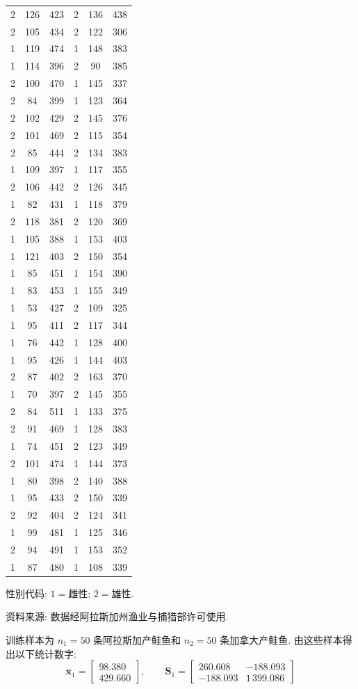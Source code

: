 \begin{mvtable}
\begin{longtable}{cccccc}
2 & 126 & 423 & 2 & 136 & 438\\
2 & 105 & 434 & 2 & 122 & 306\\
1 & 119 & 474 & 1 & 148 & 383\\
1 & 114 & 396 & 2 & 90 & 385\\
2 & 100 & 470 & 1 & 145 & 337\\
2 & 84 & 399 & 1 & 123 & 364\\
2 & 102 & 429 & 2 & 145 & 376\\
2 & 101 & 469 & 2 & 115 & 354\\
2 & 85 & 444 & 2 & 134 & 383\\
1 & 109 & 397 & 1 & 117 & 355\\
2 & 106 & 442 & 2 & 126 & 345\\
1 & 82 & 431 & 1 & 118 & 379\\
2 & 118 & 381 & 2 & 120 & 369\\
1 & 105 & 388 & 1 & 153 & 403\\
1 & 121 & 403 & 2 & 150 & 354\\
1 & 85 & 451 & 1 & 154 & 390\\
1 & 83 & 453 & 1 & 155 & 349\\
1 & 53 & 427 & 2 & 109 & 325\\
1 & 95 & 411 & 2 & 117 & 344\\
1 & 76 & 442 & 1 & 128 & 400\\
1 & 95 & 426 & 1 & 144 & 403\\
2 & 87 & 402 & 2 & 163 & 370\\
1 & 70 & 397 & 2 & 145 & 355\\
2 & 84 & 511 & 1 & 133 & 375\\
2 & 91 & 469 & 1 & 128 & 383\\
1 & 74 & 451 & 2 & 123 & 349\\
2 & 101 & 474 & 1 & 144 & 373\\
1 & 80 & 398 & 2 & 140 & 388\\
1 & 95 & 433 & 2 & 150 & 339\\
2 & 92 & 404 & 2 & 124 & 341\\
1 & 99 & 481 & 1 & 125 & 346\\
2 & 94 & 491 & 1 & 153 & 352\\
1 & 87 & 480 & 1 & 108 & 339\\
\end{longtable}
\end{mvtable}

性别代码: $1=$雌性; $2=$雄性.

资料来源: 数据经阿拉斯加州渔业与捕猎部许可使用.

训练样本为 $n_1=50$ 条阿拉斯加产鲑鱼和 $n_2=50$ 条加拿大产鲑鱼. 由这些样本得出以下统计数字:
\[
\bar{\mathbf{x}}_1=\begin{bmatrix}98.380\\429.660\end{bmatrix},\qquad \mathbf{S}_1=\begin{bmatrix}260.608&-188.093\\-188.093&1\,399.086\end{bmatrix}
\]
